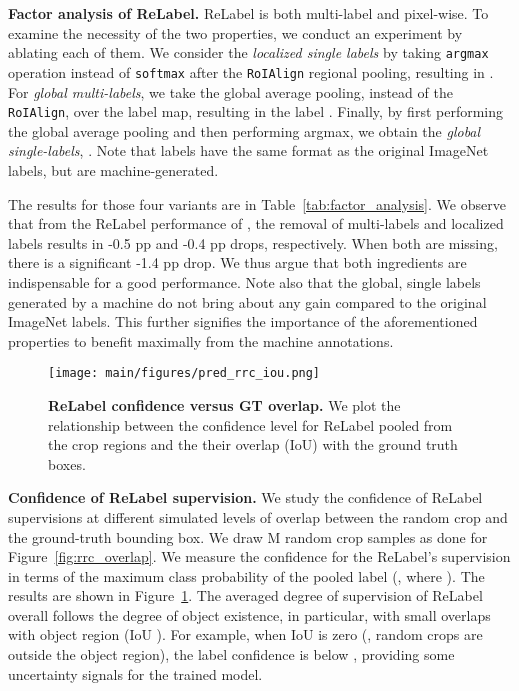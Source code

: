 \documentclass[final]{cvpr}
\newcommand\ours{{{\mbox{ReLabel}}}\xspace}
\begin{document}
\noindent\textbf{Factor analysis of \ours.}
\ours is both multi-label and pixel-wise.
To examine the necessity of the two properties, we conduct an experiment by ablating each of them.
We consider the \textit{localized single labels} by taking \texttt{argmax} operation instead of \texttt{softmax} after the \texttt{RoIAlign} regional pooling, resulting in .
For \textit{global multi-labels}, we take the global average pooling, instead of the \texttt{RoIAlign}, over the label map, resulting in the label . Finally, by first performing the global average pooling and then performing argmax, we obtain the \textit{global single-labels}, . Note that  labels have the same format as the original ImageNet labels, but are machine-generated.

The results for those four variants are in Table~\ref{tab:factor_analysis}.
We observe that from the \ours performance of , the removal of multi-labels and localized labels results in -0.5 pp and -0.4 pp drops, respectively. When both are missing, there is a significant -1.4 pp drop. We thus argue that both ingredients are indispensable for a good performance. Note also that the global, single labels generated by a machine do not bring about any gain compared to the original ImageNet labels. This further signifies the importance of the aforementioned properties to benefit maximally from the machine annotations.




\begin{figure}[t]
\vspace{-0.25cm}
\centering
\texttt{[image: main/figures/pred\_rrc\_iou.png]}
\caption{
\textbf{\ours confidence versus GT overlap.} We plot the relationship between the confidence level for \ours pooled from the crop regions and the their overlap (IoU) with the ground truth boxes. 
}
\label{fig:rrc_score_iou}
\vspace{-0.25cm}
\end{figure}


\noindent\textbf{Confidence of \ours supervision.}
We study the confidence of \ours supervisions at different simulated levels of overlap between the random crop and the ground-truth bounding box. 
We draw M random crop samples as done for Figure~\ref{fig:rrc_overlap}.
{We measure the confidence for the \ours's supervision in terms of the maximum class probability of the pooled label (\ie,  where ).}
The results are shown in Figure~\ref{fig:rrc_score_iou}.
The averaged degree of supervision of \ours overall follows the degree of object existence, in particular, with small overlaps with object region (IoU ).
For example, when IoU is zero (\ie, random crops are outside the object region), the label confidence is below , providing some uncertainty signals for the trained model. 
\end{document}
